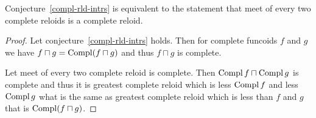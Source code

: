 \begin{prop}
Conjecture~\ref{compl-rld-intrs} is equivalent to the statement that meet of every two complete reloids is a complete reloid.
\end{prop}

\begin{proof}
Let conjecture~\ref{compl-rld-intrs} holds. Then for complete funcoids $f$ and $g$ we have $f \sqcap g =
\operatorname{Compl} (f \sqcap g)$ and thus $f \sqcap g$ is complete.

Let meet of every two complete reloid is complete. Then $\operatorname{Compl} f \sqcap
\operatorname{Compl} g$ is complete and thus it is greatest complete reloid which is
less $\operatorname{Compl} f$ and less $\operatorname{Compl} g$ what is the same as greatest
complete reloid which is less than $f$ and $g$ that is $\operatorname{Compl} (f \sqcap
g)$.
\end{proof}

